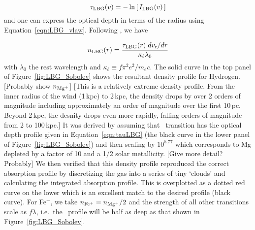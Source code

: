 \documentclass[12pt,preprint]{aastex}
\begin{document}
\begin{equation}
\tau_{\rm LBG}(v) = -\ln \left [ \, I_{\rm LBG}(v) \, \right ]
\label{eqn:tauLBG}
\end{equation}
and one can express the optical depth in terms of the radius using
Equation~\ref{eqn:LBG_vlaw}.  Following \cite{sobolev60}, we have

\begin{equation}
n_{\rm LBG}(r) = \frac{\tau_{\rm LBG}(r) \; dv_{\rm r}/dr}{\kappa_\ell
  \lambda_0}
\label{eqn:Sobolev}
\end{equation}
with $\lambda_0$ the rest wavelength and $\kappa_\ell \equiv f\pi^2
e^2/m_e c$.  The solid curve in the top panel of Figure~\ref{fig:LBG_Sobolev} shows the
resultant density profile for Hydrogen.  [Probably show $n_{\rm
  Mg^+}$]
[This is a relatively extreme density profile.  From the inner radius
of the wind (1\,kpc) to 2\,kpc, the density drops by over 2 orders of
magnitude including approximately an order of magnitude over the first
10\,pc.  Beyond 2\,kpc, the desnity drops even more rapidly, falling
orders of magnitude from 2 to 100\,kpc.]
It was derived by assuming
that \mgiia\ transition has the optical depth profile given in
Equation~\ref{eqn:tauLBG} (the black curve in the lower panel of
Figure~\ref{fig:LBG_Sobolev})  and then scaling by $10^{5.77}$ which 
corresponds to Mg depleted by a factor of 10 and a 1/2 solar
metallicity.  [Give more detail?  Probably]
We then verified that this density profile reproduced the correct
absorption profile by discretizing the gas into a series of tiny
`clouds' and calculating the integrated absorption profile.  This is
overplotted as a dotted red curve on the lower which is an excellent
match to the desired profile (black curve).
For Fe$^+$, we take $n_{\rm Fe^+} = n_{\rm Mg^+}/2$ and the strength
of all other transitions scale as $f\lambda$, i.e.\ the 
\mgiib\ profile will be half as deep as that shown in
Figure~\ref{fig:LBG_Sobolev}.
\end{document}
